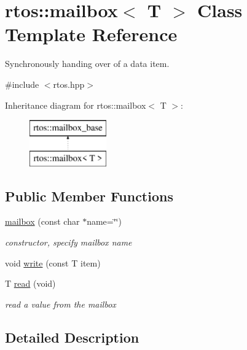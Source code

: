 \hypertarget{classrtos_1_1mailbox}{}\section{rtos\+:\+:mailbox$<$ T $>$ Class Template Reference}
\label{classrtos_1_1mailbox}


Synchronously handing over of a data item.  




{\ttfamily \#include $<$rtos.\+hpp$>$}

Inheritance diagram for rtos\+:\+:mailbox$<$ T $>$\+:\begin{figure}[H]
\begin{center}
\leavevmode
\includegraphics[height=2.000000cm]{classrtos_1_1mailbox}
\end{center}
\end{figure}
\subsection*{Public Member Functions}
\begin{DoxyCompactItemize}
\item 
\hyperlink{classrtos_1_1mailbox_a31d61fcc4b21f6450ffc55f7de1da968}{mailbox} (const char $\ast$name=\char`\"{}\char`\"{})
\begin{DoxyCompactList}\small\item\em constructor, specify mailbox name \end{DoxyCompactList}\item 
void \hyperlink{classrtos_1_1mailbox_aa49a194170b9a498982c7867462e99d0}{write} (const T item)
\item 
T \hyperlink{classrtos_1_1mailbox_aba12a2a7ff395526f88eb9014e26604a}{read} (void)
\begin{DoxyCompactList}\small\item\em read a value from the mailbox \end{DoxyCompactList}\end{DoxyCompactItemize}


\subsection{Detailed Description}
